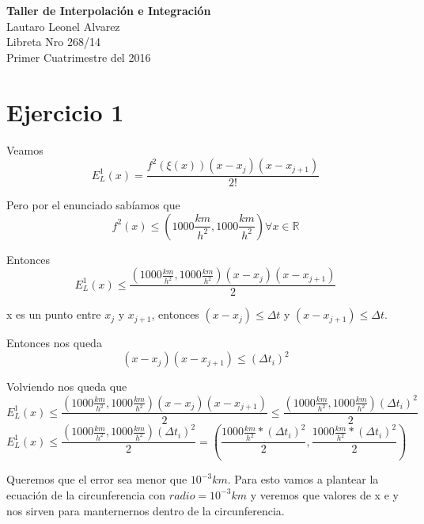 \documentclass[a4paper,10pt]{article}
\begin{document}
\begin{addmargin}[8cm]{0cm}
	\textbf{Taller de Interpolación e Integración} \\
	Lautaro Leonel Alvarez \\
	Libreta Nro 268/14 \\
	Primer Cuatrimestre del 2016 \\
\end{addmargin}



\section{Ejercicio 1}
\par Veamos
\begin{equation}
	E_L^1(x) =  \frac{f^2(\xi(x))(x - x_j)(x - x_{j+1})}{2!}
\end{equation}
\par Pero por el enunciado sabíamos que
\begin{equation}
	f^2(x) \leq (1000 \frac{km}{h^2}, 1000 \frac{km}{h^2}) \forall x \in \mathds{R}
\end{equation}
\par Entonces
\begin{equation}
	E_L^1(x) \leq \frac{(1000 \frac{km}{h^2}, 1000 \frac{km}{h^2})(x - x_j)(x - x_{j+1})}{2}
\end{equation}
\par x es un punto entre $x_j$ y $x_{j+1}$, entonces $(x - x_j) \le \Delta t$ y $(x - x_{j+1}) \le \Delta t$.
\par Entonces nos queda
\begin{equation}
	(x - x_j)(x - x_{j+1}) \leq (\Delta t_i)^2
\end{equation}
\par Volviendo nos queda que
\begin{equation}
	E_L^1(x) \leq \frac{(1000 \frac{km}{h^2}, 1000 \frac{km}{h^2})(x - x_j)(x - x_{j+1})}{2} \leq \frac{(1000 \frac{km}{h^2}, 1000 \frac{km}{h^2})(\Delta t_i)^2}{2}
\end{equation}
\begin{equation}
	E_L^1(x) \leq \frac{(1000 \frac{km}{h^2}, 1000 \frac{km}{h^2})(\Delta t_i)^2}{2}  = (\frac{1000 \frac{km}{h^2} * (\Delta t_i)^2}{2}, \frac{1000 \frac{km}{h^2} * (\Delta t_i)^2}{2})
\end{equation}
\par Queremos que el error sea menor que $10^{-3}km$. Para esto vamos a plantear la ecuación de la circunferencia con $radio = 10^{-3}km$ y veremos que valores de x e y nos sirven para manternernos dentro de la circunferencia.
\end{document}
